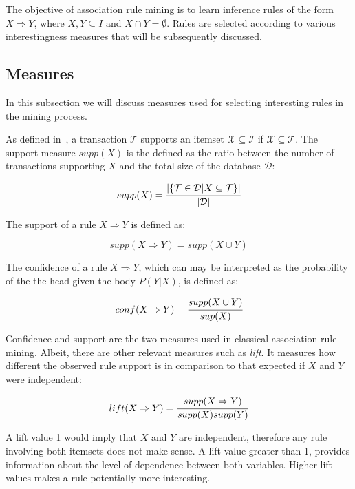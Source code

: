 The objective of association rule mining is to learn inference rules of the form $X \Rightarrow Y$, where $X,Y
\subseteq I$ and $X \cap Y = \emptyset$. Rules are selected according to various interestingness measures that will be
subsequently discussed.

\subsection{Measures}

In this subsection we will discuss measures used for selecting interesting rules in the mining process.

As defined in~\citet{Agrawal:1993:MAR:170036.170072}, a transaction $\mathcal{T}$ supports an itemset
$\mathcal{X} \subseteq \mathcal{I}$ if $\mathcal{X} \subseteq
\mathcal{T}$. The support measure $supp(X)$ is the defined as the ratio between the number of transactions supporting
$X$ and the total size of the database $\mathcal{D}$:

\begin{equation}
 supp(X)=\cfrac{|\{ \mathcal{T} \in \mathcal{D} | X \subseteq \mathcal{T} \}|}{|\mathcal{D}|}
\end{equation}

The support of a rule $X \Rightarrow Y$ is defined as:

\begin{equation}
 supp(X \Rightarrow Y)=supp(X \cup Y)
\end{equation}

The confidence of a rule $X \Rightarrow Y$, which can may be interpreted as the probability of the the head given the
body $P(Y|X)$, is defined as:

\begin{equation}
 conf(X \Rightarrow Y)=\cfrac{supp(X \cup Y)}{sup(X)}
\end{equation}

Confidence and support are the two measures used in classical association rule mining. Albeit, there are other
relevant
measures such as \emph{lift}. It measures how different the observed rule support is in comparison to that expected if
$X$ and $Y$ were independent:

\begin{equation}
 lift(X \Rightarrow Y)=\cfrac{supp(X \Rightarrow Y)}{supp(X)supp(Y)}
\end{equation}

A lift value 1 would imply that $X$ and $Y$ are independent, therefore any rule involving both itemsets does not make
sense. A lift value greater than 1, provides information about the level of dependence between both variables. Higher
lift values makes a rule potentially more interesting.

